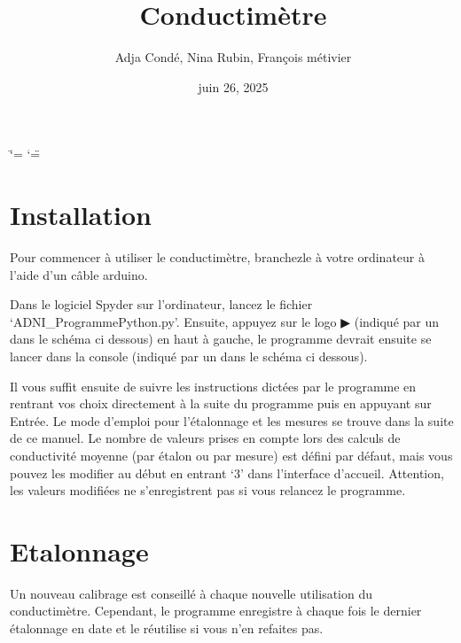 \documentclass[letterpaper,10pt,french]{sphinxmanual}
\title{Conductimètre}
\date{juin 26, 2025}
\author{Adja Condé, Nina Rubin, François métivier}
\begin{document}
\ifdefined\shorthandoff
  \ifnum\catcode`\=\string=\active\shorthandoff{=}\fi
  \ifnum\catcode`\"=\active{}\fi
\fi

\pagestyle{empty}
\sphinxmaketitle
\pagestyle{plain}
\sphinxtableofcontents
\pagestyle{normal}
\label{\detokenize{index::doc}}


\sphinxstepscope


\chapter{Installation}
\label{\detokenize{Installation:installation}}\label{\detokenize{Installation::doc}}
\sphinxAtStartPar
Pour commencer à utiliser le conductimètre,
branchez\sphinxhyphen{}le à votre ordinateur à l’aide d’un câble
arduino.

\begin{figure}[htbp]
\centering

\noindent{}
\end{figure}

\sphinxAtStartPar
Dans le logiciel Spyder sur l’ordinateur, lancez le
fichier ‘ADNI\_ProgrammePython.py’. Ensuite, appuyez
sur le logo ▶︎ (indiqué par un  dans le schéma ci\sphinxhyphen{} dessous)  en haut à gauche, le programme devrait ensuite se lancer dans
la console (indiqué par un  dans le schéma ci\sphinxhyphen{} dessous).

\begin{figure}[htbp]
\centering

\noindent{}
\end{figure}

\sphinxAtStartPar
Il vous suffit ensuite de suivre les instructions dictées par le programme en rentrant vos choix
directement à la suite du programme puis en appuyant sur Entrée.
Le mode d’emploi pour l’étalonnage et les mesures se trouve
dans la suite de ce manuel.
Le nombre de valeurs prises en compte lors des calculs de
conductivité moyenne (par étalon ou par mesure) est défini par défaut, mais vous pouvez les modifier au début en
entrant ‘3’ dans l’interface d’accueil. Attention, les valeurs modifiées ne s’enregistrent pas si vous
relancez le programme.

\sphinxstepscope


\chapter{Etalonnage}
\label{\detokenize{Etalonnage:etalonnage}}\label{\detokenize{Etalonnage::doc}}
\sphinxAtStartPar
Un nouveau calibrage est conseillé à chaque nouvelle utilisation du conductimètre.
Cependant, le programme enregistre à chaque fois le dernier étalonnage en date et le réutilise si
vous n’en refaites pas.
\end{document}
